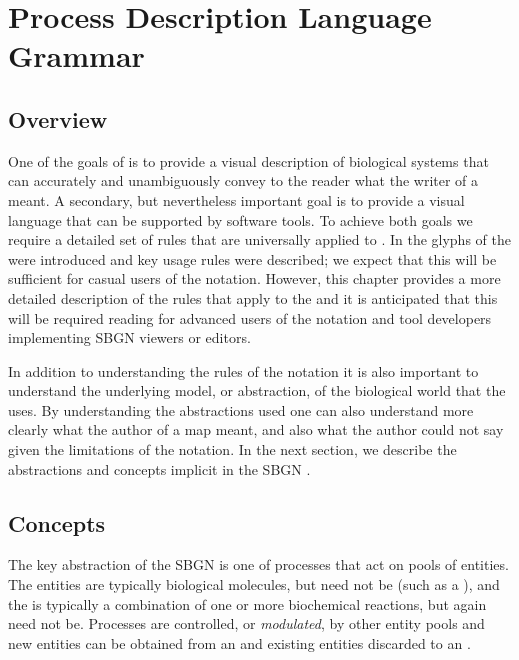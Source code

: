\chapter{Process Description Language Grammar}
\label{chp:grammar}

\section{Overview}

One of the goals of \SBGNPDLone is to provide a visual description of biological systems that can accurately and unambiguously  convey to the reader what the writer of a \PDm meant. A secondary, but nevertheless important goal is to provide a visual language that can be supported by software tools. To achieve both goals we require a detailed set of rules that are universally applied to \PDms. In  the glyphs of the \PDl were introduced and key usage rules were described; we expect that this will be sufficient for casual users of the notation. However, this chapter provides a more detailed description of the rules that apply to the \PDl and it is anticipated that this will be required reading for advanced users of the notation and tool developers implementing SBGN \PD viewers or editors.

In addition to understanding the rules of the notation it is also important to understand the underlying model, or abstraction, of the biological world that the \PDl uses. By understanding the abstractions used one can also understand more clearly what the author of a map meant, and also what the author could not say given the limitations of the notation. In the next section, we describe the abstractions and concepts implicit in the SBGN \PDl.

\section{Concepts}
\label{sec:concepts}

The key abstraction of the SBGN \PDl is one of  processes that act on pools of entities. The entities are typically biological molecules, but need not be (such as a ), and the  is typically a combination of one or more  biochemical reactions, but again need not be.
Processes are controlled, or \emph{modulated}, by other entity pools and new entities can be obtained from an  and existing entities discarded to an .

